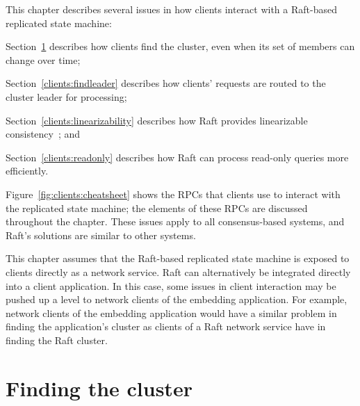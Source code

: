 This chapter describes several issues in how clients interact with a
Raft-based replicated state machine:
\begin{compactitem}
\item Section~\ref{clients:findcluster} describes how clients find the
cluster, even when its set of members can change over time;
\item Section~\ref{clients:findleader} describes how clients' requests
are routed to the cluster leader for processing;
\item Section~\ref{clients:linearizability} describes how Raft provides
linearizable consistency~\cite{Herlihy:1990}; and
\item Section~\ref{clients:readonly} describes how Raft can process
read-only queries more efficiently.
\end{compactitem}
Figure~\ref{fig:clients:cheatsheet} shows the RPCs that clients use to
interact with the replicated state machine; the elements of these RPCs are
discussed throughout the chapter.
These issues apply to all consensus-based systems, and
Raft's solutions are similar to other systems.

This chapter assumes that the Raft-based replicated state machine
is exposed to clients directly as a network service. Raft can
alternatively be
integrated directly into a client application. In this case, some issues
in client interaction may be pushed up a level to network clients of the
embedding application. For example, network clients of the embedding
application would have a similar problem in finding the application's cluster
as clients of a Raft network service have in finding the Raft cluster.

\section{Finding the cluster}
\label{clients:findcluster}

